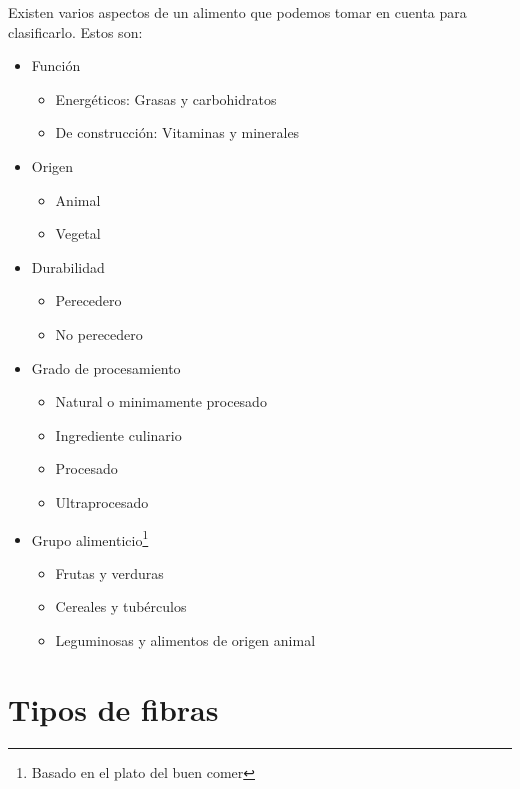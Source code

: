 Existen varios aspectos de un alimento que podemos tomar en cuenta para clasificarlo. Estos son:

\begin{itemize}
    \item Función
        \begin{itemize}
	        \item Energéticos: Grasas y carbohidratos
	        \item De construcción: Vitaminas y minerales
	    \end{itemize}
    
    \item Origen
        \begin{itemize}
	        \item Animal
	        \item Vegetal
        \end{itemize}
    
    \item Durabilidad
        \begin{itemize}
	        \item Perecedero
	        \item No perecedero
        \end{itemize}
    
    \item Grado de procesamiento
        \begin{itemize}
	        \item Natural o minimamente procesado
	        \item Ingrediente culinario
	        \item Procesado
	        \item Ultraprocesado
        \end{itemize}
    
    \item Grupo alimenticio\footnote{Basado en el plato del buen comer}
        \begin{itemize}
	        \item Frutas y verduras
	        \item Cereales y tubérculos
	        \item Leguminosas y alimentos de origen animal
        \end{itemize}
        
\end{itemize}

\section{Tipos de fibras}



